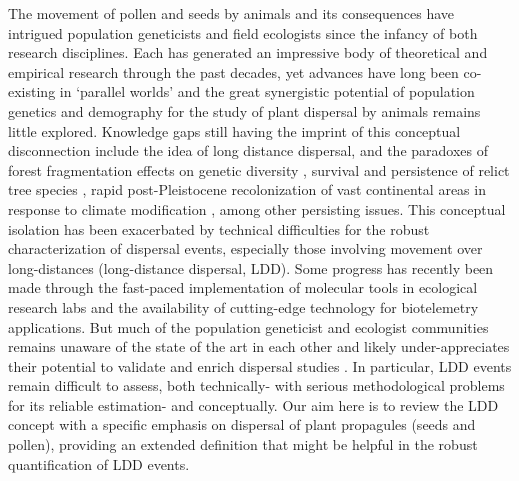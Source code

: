 \documentclass[a4paper, 12pt]{article}
\begin{document}
\begin{linenumbers}
The movement of pollen and seeds by animals and its consequences have intrigued population geneticists and field ecologists since the infancy of both research disciplines. Each has generated an impressive body of theoretical and empirical research through the past decades, yet advances have long been co-existing in ‘parallel worlds’ and the great synergistic potential of population genetics and demography for the study of plant dispersal by animals remains little explored. Knowledge gaps still having the imprint of this conceptual disconnection include the idea of long distance dispersal, and the paradoxes of forest fragmentation effects on genetic diversity \citep{Kramer:2008kg}, survival and persistence of relict tree species \citep{Hampe:2011bv}, rapid post-Pleistocene recolonization of vast continental areas in response to climate modification \citep{Clark:1998aa,Clark:1998vi}, among other persisting issues. This conceptual isolation has been exacerbated by technical difficulties for the robust characterization of dispersal events, especially those involving movement over long-distances (long-distance dispersal, LDD). Some progress has recently been made through the fast-paced implementation of molecular tools in ecological research labs and the availability of cutting-edge technology for biotelemetry applications. But much of the population geneticist and ecologist communities remains unaware of the state of the art in each other and likely under-appreciates their potential to validate and enrich dispersal studies \citep{Jones:2008il}. In particular, LDD events remain difficult to assess, both technically- with serious methodological problems for its reliable estimation- and conceptually. Our aim here is to review the LDD concept with a specific emphasis on dispersal of plant propagules (seeds and pollen), providing an extended definition that might be helpful in the robust quantification of LDD events. 


\end{linenumbers}
\end{document}
